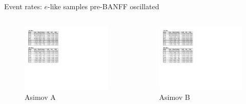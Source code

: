 \documentclass{beamer}
\begin{document}
\begin{frame}{Event rates: $e$-like samples pre-BANFF oscillated}
	\centering

	\begin{columns}
		\begin{column}{0.5\paperwidth}
			\begin{figure}
				\includegraphics[page=2, trim={0cm 8cm 13cm 1cm}, clip, scale=0.52] {images/rates/prefit_A}
				\caption*{Asimov A}
			\end{figure}
		\end{column}
		\begin{column}{0.5\paperwidth}
			\begin{figure}
				\includegraphics[page=2, trim={0cm 8cm 13cm 1cm}, clip, scale=0.52] {images/rates/prefit_A}
				\caption*{Asimov B}
			\end{figure}
		\end{column}
	\end{columns}
\end{frame}
\end{document}

